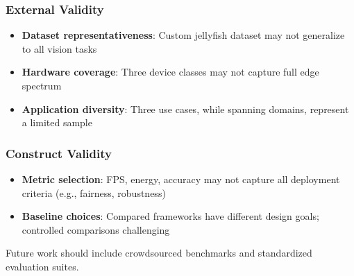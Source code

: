\subsubsection{External Validity}
\begin{itemize}
\item \textbf{Dataset representativeness}: Custom jellyfish dataset may not generalize to all vision tasks
\item \textbf{Hardware coverage}: Three device classes may not capture full edge spectrum
\item \textbf{Application diversity}: Three use cases, while spanning domains, represent a limited sample
\end{itemize}

\subsubsection{Construct Validity}
\begin{itemize}
\item \textbf{Metric selection}: FPS, energy, accuracy may not capture all deployment criteria (e.g., fairness, robustness)
\item \textbf{Baseline choices}: Compared frameworks have different design goals; controlled comparisons challenging
\end{itemize}

Future work should include crowdsourced benchmarks and standardized evaluation suites.
